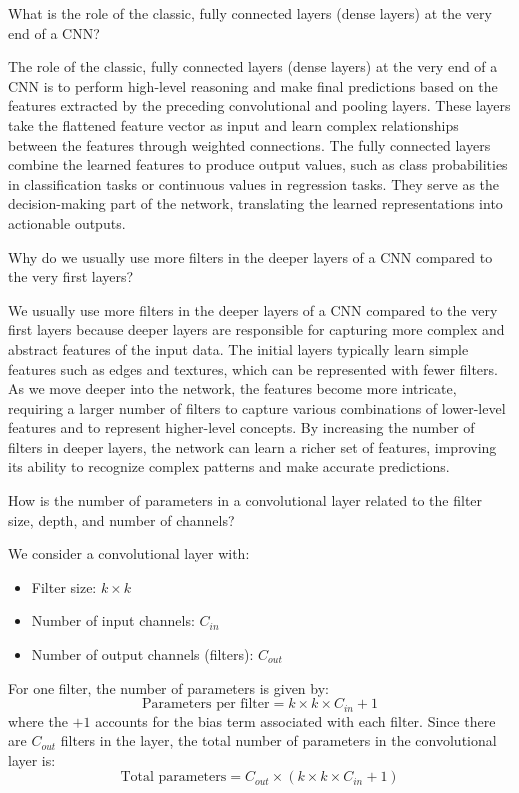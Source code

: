 \begin{ejercicio}
    What is the role of the classic, fully connected layers (dense layers) at the very end of a CNN?

    The role of the classic, fully connected layers (dense layers) at the very end of a CNN is to perform high-level reasoning and make final predictions based on the features extracted by the preceding convolutional and pooling layers. These layers take the flattened feature vector as input and learn complex relationships between the features through weighted connections. The fully connected layers combine the learned features to produce output values, such as class probabilities in classification tasks or continuous values in regression tasks. They serve as the decision-making part of the network, translating the learned representations into actionable outputs.
\end{ejercicio}

\begin{ejercicio}
    Why do we usually use more filters in the deeper layers of a CNN compared to the very first layers?

    We usually use more filters in the deeper layers of a CNN compared to the very first layers because deeper layers are responsible for capturing more complex and abstract features of the input data. The initial layers typically learn simple features such as edges and textures, which can be represented with fewer filters. As we move deeper into the network, the features become more intricate, requiring a larger number of filters to capture various combinations of lower-level features and to represent higher-level concepts. By increasing the number of filters in deeper layers, the network can learn a richer set of features, improving its ability to recognize complex patterns and make accurate predictions.
\end{ejercicio}

\begin{ejercicio}
    How is the number of parameters in a convolutional layer related to the filter size, depth, and number of channels?

    We consider a convolutional layer with:
    \begin{itemize}
        \item Filter size: \(k \times k\)
        \item Number of input channels: \(C_{in}\)
        \item Number of output channels (filters): \(C_{out}\)
    \end{itemize}

    For one filter, the number of parameters is given by:
    \[
    \text{Parameters per filter} = k \times k \times C_{in} +1
    \]
    where the \(+1\) accounts for the bias term associated with each filter. Since there are \(C_{out}\) filters in the layer, the total number of parameters in the convolutional layer is:
    \[
    \text{Total parameters} = C_{out} \times (k \times k \times C_{in} + 1)
    \]
\end{ejercicio}

